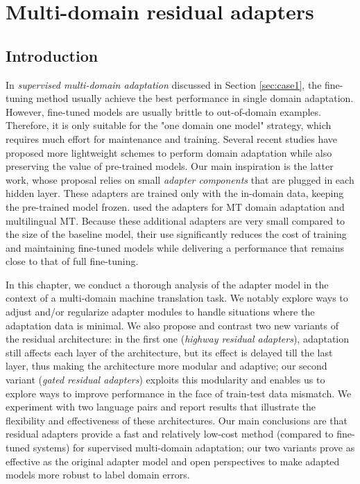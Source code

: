 \chapter{Multi-domain residual adapters}
\label{chap:res}
\section{Introduction}
In \emph{supervised multi-domain adaptation} discussed in Section \ref{sec:case1}, the fine-tuning method \citep{Luong15stanford,Freitag16fast} usually achieve the best performance in single domain adaptation. However, fine-tuned models are usually brittle to out-of-domain examples. Therefore, it is only suitable for the "one domain one model" strategy, which requires much effort for maintenance and training. Several recent studies \citep{Vilar18learning,Wuebker18compact,Michel18extreme,Bapna19simple} have proposed more lightweight schemes to perform domain adaptation while also preserving the value of pre-trained models. Our main inspiration is the latter work, whose proposal relies on small \emph{adapter components} \citep{Bapna19simple} that are plugged in each hidden layer. These adapters are trained only with the in-domain data, keeping the pre-trained model frozen. \citet{Bapna19simple} used the adapters for MT domain adaptation and multilingual MT. Because these additional adapters are very small compared to the size of the baseline model, their use significantly reduces the cost of training and maintaining fine-tuned models while delivering a performance that remains close to that of full fine-tuning.

In this chapter, we conduct a thorough analysis of the adapter model in the context of a multi-domain machine translation task. We notably explore ways to adjust and/or regularize adapter modules to handle situations where the adaptation data is minimal. We also propose and contrast two new variants of the residual architecture: in the first one (\emph{highway residual adapters}), adaptation still affects each layer of the architecture, but its effect is delayed till the last layer, thus making the architecture more modular and adaptive; our second variant (\emph{gated residual adapters}) exploits this modularity and enables us to explore ways to improve performance in the face of train-test data mismatch. We experiment with two language pairs and report results that illustrate the flexibility and effectiveness of these architectures. Our main conclusions are that residual adapters provide a fast and relatively low-cost method (compared to fine-tuned systems) for supervised multi-domain adaptation; our two variants prove as effective as the original adapter model and open perspectives to make adapted models more robust to label domain errors.

